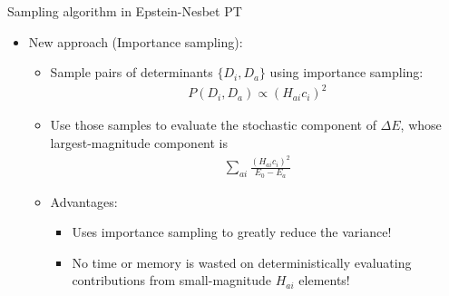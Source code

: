 \documentclass[amsmath]{beamer}
\begin{document}
\begin{frame}{Sampling algorithm in Epstein-Nesbet PT}
	\begin{itemize}
		\item New approach (Importance sampling):
		\linebreak
		\begin{itemize}
			\item Sample pairs of determinants $\{D_i, D_a\}$ %
			using importance sampling: \begin{eqnarray} P(D_i, D_a) \propto \left(H_{ai} c_i\right)^2 \end{eqnarray}
			\item Use those samples to evaluate the stochastic component of $\Delta E$, %
			whose largest-magnitude component is
			\begin{eqnarray}
				\sum_{ai %
				}\frac{ \left(H_{ai}c_i\right)^2}{E_0 - E_a}
			\end{eqnarray}
			\item Advantages:
			\begin{itemize}
				\item Uses importance sampling to greatly reduce the variance!
				\item No time or memory is wasted on deterministically evaluating contributions from small-magnitude $H_{ai}$ elements!
			\end{itemize}
		\end{itemize}
	\end{itemize}
\end{frame}
\end{document}

